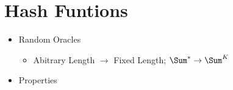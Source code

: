 \section{Hash Funtions}
\begin{itemize}
\item Random Oracles
    \begin{itemize}
    \item Abitrary Length $\rightarrow$ Fixed Length; $\Sum^* \rightarrow \Sum^K$
    \end{itemize}
\item Properties
\end{itemize}